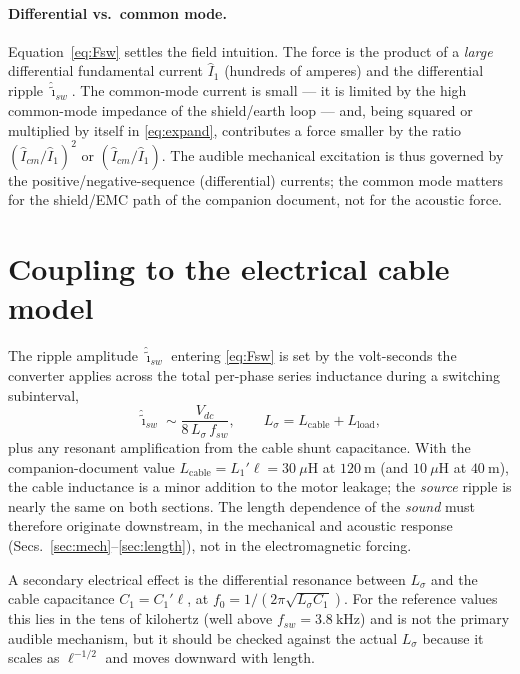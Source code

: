 \documentclass[11pt,a4paper]{article}
\begin{document}
\paragraph{Differential vs.\ common mode.}
Equation~\eqref{eq:Fsw} settles the field intuition. The force is the product of a
\emph{large} differential fundamental current $\hat I_1$ (hundreds of amperes) and
the differential ripple $\hat{\tilde\imath}_{sw}$. The common-mode current is
small --- it is limited by the high common-mode impedance of the shield/earth loop
--- and, being squared or multiplied by itself in \eqref{eq:expand}, contributes a
force smaller by the ratio $(\hat I_{cm}/\hat I_1)^2$ or $(\hat I_{cm}/\hat I_1)$.
The audible mechanical excitation is thus governed by the positive/negative-sequence
(differential) currents; the common mode matters for the shield/EMC path of the
companion document, not for the acoustic force.

\section{Coupling to the electrical cable model}
The ripple amplitude $\hat{\tilde\imath}_{sw}$ entering \eqref{eq:Fsw} is set by the
volt-seconds the converter applies across the total per-phase series inductance
during a switching subinterval,
\begin{equation}
\hat{\tilde\imath}_{sw}\sim\frac{V_{dc}}{8\,L_\sigma\,f_{sw}},
\qquad L_\sigma=L_{\text{cable}}+L_{\text{load}},
\label{eq:ripple}
\end{equation}
plus any resonant amplification from the cable shunt capacitance. With the
companion-document value $L_{\text{cable}}=L_1'\ell=30\ \mu\mathrm{H}$ at
$120\ \mathrm{m}$ (and $10\ \mu\mathrm{H}$ at $40\ \mathrm{m}$), the cable
inductance is a minor addition to the motor leakage; the \emph{source} ripple is
nearly the same on both sections. The length dependence of the \emph{sound} must
therefore originate downstream, in the mechanical and acoustic response
(Secs.~\ref{sec:mech}--\ref{sec:length}), not in the electromagnetic forcing.

A secondary electrical effect is the differential resonance between $L_\sigma$ and
the cable capacitance $C_1=C_1'\ell$, at
$f_{0}=1/(2\pi\sqrt{L_\sigma C_1})$. For the reference values this lies in the tens
of kilohertz (well above $f_{sw}=3.8\ \mathrm{kHz}$) and is not the primary audible
mechanism, but it should be checked against the actual $L_\sigma$ because it scales
as $\ell^{-1/2}$ and moves downward with length.
\end{document}
